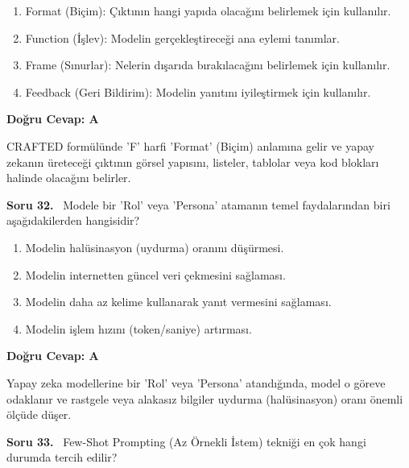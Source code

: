 \documentclass[11pt,a4paper,openany]{book}
\begin{document}
\begin{enumerate}[label=\Alph*), leftmargin=25pt, topsep=4pt, itemsep=2pt]
        \item Format (Biçim): Çıktının hangi yapıda olacağını belirlemek için kullanılır.
        \item Function (İşlev): Modelin gerçekleştireceği ana eylemi tanımlar.
        \item Frame (Sınurlar): Nelerin dışarıda bırakılacağını belirlemek için kullanılır.
        \item Feedback (Geri Bildirim): Modelin yanıtını iyileştirmek için kullanılır.
\end{enumerate}

\vspace{4pt}
\begin{tcolorbox}[title=Cevap ve Açıklama, colback=gray!3!white, colframe=primarycolor!90!black, arc=2mm, fonttitle=\bfseries\sffamily, top=6pt, bottom=6pt]
    \textbf{Doğru Cevap: A}

    \vspace{2pt}
    CRAFTED formülünde 'F' harfi 'Format' (Biçim) anlamına gelir ve yapay zekanın üreteceği çıktının görsel yapısını, listeler, tablolar veya kod blokları halinde olacağını belirler.
\end{tcolorbox}
\vspace{10pt}
\needspace{5cm}
\vspace{8pt}
\noindent\textbf{\large\sffamily Soru 32.} \ Modele bir 'Rol' veya 'Persona' atamanın temel faydalarından biri aşağıdakilerden hangisidir?

\begin{enumerate}[label=\Alph*), leftmargin=25pt, topsep=4pt, itemsep=2pt]
        \item Modelin halüsinasyon (uydurma) oranını düşürmesi.
        \item Modelin internetten güncel veri çekmesini sağlaması.
        \item Modelin daha az kelime kullanarak yanıt vermesini sağlaması.
        \item Modelin işlem hızını (token/saniye) artırması.
\end{enumerate}

\vspace{4pt}
\begin{tcolorbox}[title=Cevap ve Açıklama, colback=gray!3!white, colframe=primarycolor!90!black, arc=2mm, fonttitle=\bfseries\sffamily, top=6pt, bottom=6pt]
    \textbf{Doğru Cevap: A}

    \vspace{2pt}
    Yapay zeka modellerine bir 'Rol' veya 'Persona' atandığında, model o göreve odaklanır ve rastgele veya alakasız bilgiler uydurma (halüsinasyon) oranı önemli ölçüde düşer.
\end{tcolorbox}
\vspace{10pt}
\needspace{5cm}
\vspace{8pt}
\noindent\textbf{\large\sffamily Soru 33.} \ Few-Shot Prompting (Az Örnekli İstem) tekniği en çok hangi durumda tercih edilir?
\end{document}
